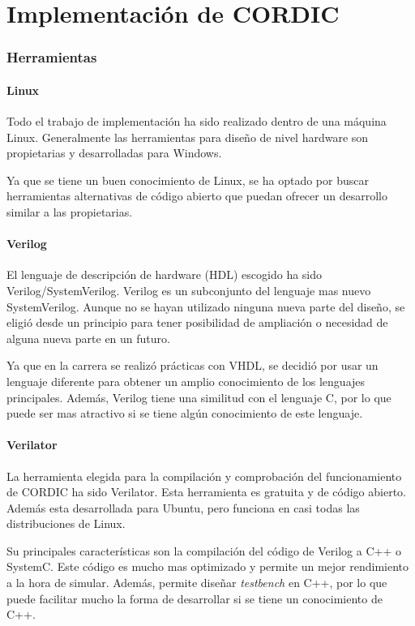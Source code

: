 \chapter{Implementación de CORDIC}

\subsection{Herramientas}
\subsubsection{Linux}
Todo el trabajo de implementación ha sido realizado dentro de una máquina Linux. Generalmente las herramientas para diseño de nivel hardware son propietarias y desarrolladas para Windows.

Ya que se tiene un buen conocimiento de Linux, se ha optado por buscar herramientas alternativas de código abierto que puedan ofrecer un desarrollo similar a las propietarias.
\subsubsection{Verilog}
El lenguaje de descripción de hardware (HDL) escogido ha sido Verilog/SystemVerilog. Verilog es un subconjunto del lenguaje mas nuevo SystemVerilog. Aunque no se hayan utilizado ninguna nueva parte del diseño, se eligió desde un principio para tener posibilidad de ampliación o necesidad de alguna nueva parte en un futuro.

Ya que en la carrera se realizó prácticas con VHDL, se decidió por usar un lenguaje diferente para obtener un amplio conocimiento de los lenguajes principales. Además, Verilog tiene una similitud con el lenguaje C, por lo que puede ser mas atractivo si se tiene algún conocimiento de este lenguaje.

\subsubsection{Verilator}
La herramienta elegida para la compilación y comprobación del funcionamiento de CORDIC ha sido Verilator. Esta herramienta es gratuita y de código abierto. Además esta desarrollada para Ubuntu, pero funciona en casi todas las distribuciones de Linux.

Su principales características son la compilación del código de Verilog a C++ o SystemC. Este código es mucho mas optimizado y permite un mejor rendimiento a la hora de simular. Además, permite diseñar \textit{testbench} en C++, por lo que puede facilitar mucho la forma de desarrollar si se tiene un conocimiento de C++.

